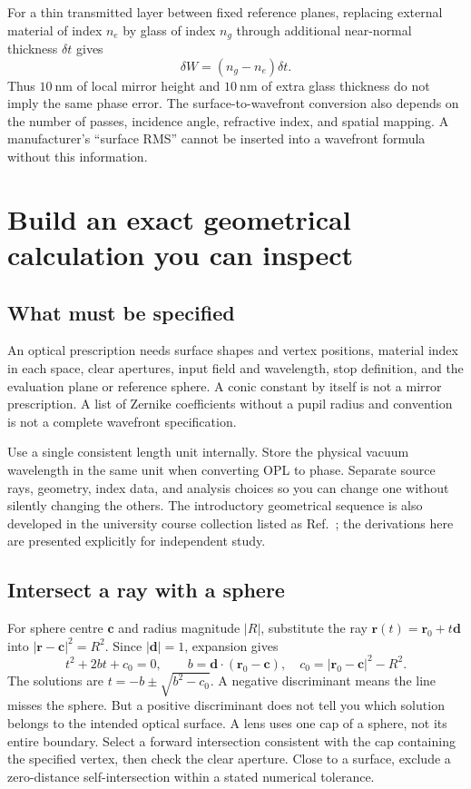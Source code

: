 For a thin transmitted layer between fixed reference planes, replacing external material of index $n_e$ by glass of index $n_g$ through additional near-normal thickness $\delta t$ gives
\begin{equation}
\boxed{\delta W=(n_g-n_e)\delta t.}
\label{fnd:transmittedthickness}
\end{equation}
Thus $10\ \mathrm{nm}$ of local mirror height and $10\ \mathrm{nm}$ of extra glass thickness do not imply the same phase error. The surface-to-wavefront conversion also depends on the number of passes, incidence angle, refractive index, and spatial mapping. A manufacturer's ``surface RMS'' cannot be inserted into a wavefront formula without this information.

\chapter{Build an exact geometrical calculation you can inspect}
\label{fnd:exacttrace}
\section{What must be specified}
An optical prescription needs surface shapes and vertex positions, material index in each space, clear apertures, input field and wavelength, stop definition, and the evaluation plane or reference sphere. A conic constant by itself is not a mirror prescription. A list of Zernike coefficients without a pupil radius and convention is not a complete wavefront specification.

Use a single consistent length unit internally. Store the physical vacuum wavelength in the same unit when converting OPL to phase. Separate source rays, geometry, index data, and analysis choices so you can change one without silently changing the others. The introductory geometrical sequence is also developed in the university course collection listed as Ref.~\cite{greivenkamp502}; the derivations here are presented explicitly for independent study.

\section{Intersect a ray with a sphere}
For sphere centre $\bm{c}$ and radius magnitude $|R|$, substitute the ray $\bm{r}(t)=\bm{r}_0+t\bm{d}$ into $|\bm{r}-\bm{c}|^2=R^2$. Since $|\bm{d}|=1$, expansion gives
\[
t^2+2bt+c_0=0,\qquad
b=\bm{d}\cdot(\bm{r}_0-\bm{c}),\quad
c_0=|\bm{r}_0-\bm{c}|^2-R^2.
\]
The solutions are $t=-b\pm\sqrt{b^2-c_0}$. A negative discriminant means the line misses the sphere. But a positive discriminant does not tell you which solution belongs to the intended optical surface. A lens uses one cap of a sphere, not its entire boundary. Select a forward intersection consistent with the cap containing the specified vertex, then check the clear aperture. Close to a surface, exclude a zero-distance self-intersection within a stated numerical tolerance.

